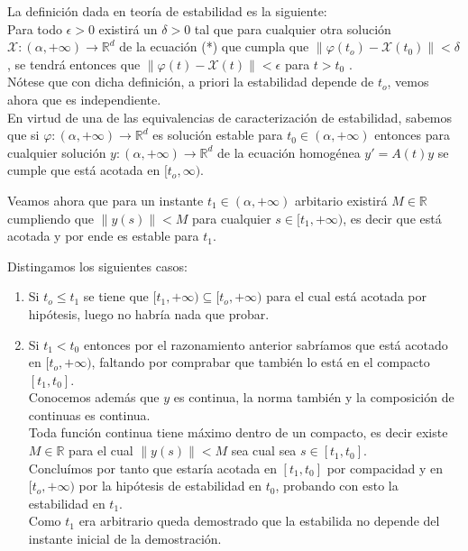 \documentclass[a4paper , 14pt, spanish ]{article}
\begin{document}
 La definición dada en teoría de estabilidad es la siguiente:  \\

Para todo $\epsilon > 0$ existirá  un $\delta > 0$ tal que para cualquier
otra solución 
$\mathcal X  : (\alpha , + \infty) \rightarrow \mathbb R^d$ de la ecuación (*) que cumpla que   $\| \varphi(t_o) - \mathcal X(t_0) \| < \delta$,
se tendrá entonces que   $\| \varphi(t) - \mathcal X(t) \| < \epsilon$ para  $t>t_0$ . \\

Nótese que con dicha definición, a priori la estabilidad depende de $t_o$, vemos ahora que es independiente. \\



En virtud de una de las equivalencias de caracterización de estabilidad, sabemos que  si
$\varphi : (\alpha , + \infty) \rightarrow \mathbb R^d$ es solución estable para $t_0 \in (\alpha, +\infty)$  entonces
para cualquier solución $y : (\alpha , + \infty) \rightarrow \mathbb R^d$ de la ecuación homogénea $y' = A(t) y$ se cumple que está acotada en
$[t_o, \infty)$.

Veamos ahora que para un instante  $t_1 \in (\alpha, +\infty)$ arbitario  existirá $M \in \mathbb R$ cumpliendo  que 
$\|y(s)\|< M$ para cualquier $s \in [t_1, +\infty)$, es decir que está acotada y por ende es estable para $t_1$.

Distingamos los siguientes casos:

\begin{enumerate}

\item Si $t_o \leq t_1$ se tiene que $[t_1, +\infty) \subseteq [t_o, +\infty)$ para el cual está acotada por hipótesis, luego no habría nada que probar.

\item Si $t_1 < t_0$ entonces por el razonamiento anterior sabríamos que está acotado en $[t_o, +\infty)$, faltando por comprabar que también lo está en el
  compacto $[t_1, t_0]$. \\

  Conocemos además que $y$ es continua,  la norma también y la composición de continuas es continua. \\

  Toda función continua tiene  máximo dentro de un compacto, es decir existe $M \in \mathbb R$ para el cual $\|y(s)\|< M$ sea cual sea $s \in [t_1, t_0]$. \\

  Concluímos por tanto que estaría acotada en $[t_1, t_0]$  por compacidad y en $[t_o, +\infty)$ por la hipótesis de estabilidad en $t_0$, probando con esto la estabilidad en $t_1.$ \\

    Como $t_1$ era arbitrario queda demostrado que la estabilida no depende del instante inicial de la demostración. 

    

  
  
\end{enumerate}
\end{document}
